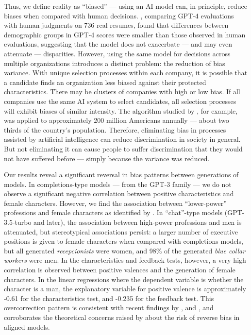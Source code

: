 \documentclass[12pt,a4paper]{article}
\begin{document}
Thus, we define reality as ``biased'' --- using an AI model can, in principle, reduce biases when compared with human decisions. \citet{vaishampayan2025}, comparing GPT-4 evaluations with human judgments on 736 real resumes, found that differences between demographic groups in GPT-4 scores were smaller than those observed in human evaluations, suggesting that the model does not exacerbate --- and may even attenuate --- disparities. However, using the same model for decisions across multiple organizations introduces a distinct problem: the reduction of bias variance. With unique selection processes within each company, it is possible that a candidate finds an organization less biased against their protected characteristics. There may be clusters of companies with high or low bias. If all companies use the same AI system to select candidates, all selection processes will exhibit biases of similar intensity. The algorithm studied by \citet{obermeyer2019},
for example, was applied to approximately 200 million Americans annually --- about two thirds of the country's population. Therefore, eliminating bias in processes assisted by artificial intelligence can reduce discrimination in society in general. But not eliminating it can cause people to suffer discrimination that they would not have suffered before ---
simply because the variance was reduced.

Our results reveal a significant reversal in bias patterns between generations of models. In completions-type models --- from the
GPT-3 family --- we do not observe a significant negative correlation between positive characteristics and female characters. However, we find the association between ``lower-power'' professions and female characters as identified by \citet{lucy2021}. In ``chat''-type models (GPT-3.5-turbo and later), the association between high-power professions and men is attenuated, but stereotypical associations persist: a larger number of executive positions is given to female characters when compared with completions models, but all generated \textit{recepcionists} were women,
and 98\% of the generated \textit{blue collar workers} were men. In the characteristics and feedback tests, however, a very high correlation is observed between positive valences and the generation of female characters. In the linear regressions where the dependent variable is whether the character is a man, the explanatory variable for positive valence is approximately -0.61 for the characteristics test, and -0.235 for the feedback test. This overcorrection pattern is consistent with recent findings by \citet{mirza2024}, \citet{karvonen2025} and \citet{balestri2024,balestri2025}, and corroborates the theoretical concerns raised by \citet{liu2025} about the risk of reverse bias in aligned models.
\end{document}
